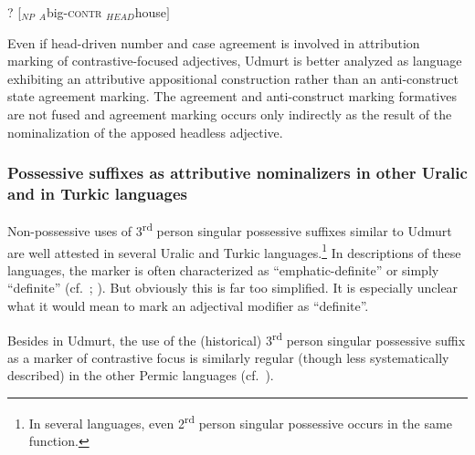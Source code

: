 \begin{exe} \label{udmurt notapposition}
\ex ? [$_{NP}$ $_{A}$big-\textsc{contr} $_{HEAD}$house$]$
\end{exe}
Even if head-driven number and case agreement is involved in attribution marking of contrastive-focused adjectives, Udmurt is better analyzed as language exhibiting an attributive appositional construction rather than an anti-construct state agreement marking. The agreement and anti-construct marking formatives are not fused and agreement marking occurs only indirectly as the result of the nominalization of the apposed headless adjective.

\subsubsection[Possessive suffixes as attributive nominalizers]{Possessive suffixes as attributive nominalizers in other Uralic and in Turkic languages}
Non-possessive uses of 3\textsuperscript{rd} person singular possessive suffixes similar to Udmurt are well attested in several Uralic and Turkic languages.\footnote{In several languages, even 2\textsuperscript{rd} person singular possessive occurs in the same function.} In descriptions of these languages, the marker is often characterized as “emphatic-definite” or simply “definite” (cf.~\citealt[148]{tauli1966}; \citealt{kunnap2004}). But obviously this is far too simplified. It is especially unclear what it would mean to mark an adjectival modifier as “definite”.

Besides in Udmurt, the use of the (historical) 3\textsuperscript{rd} person singular possessive suffix as a marker of contrastive focus is similarly regular (though less systematically described) in the other Permic languages (cf.~\citealt[67]{serebrennikov1963}). %

